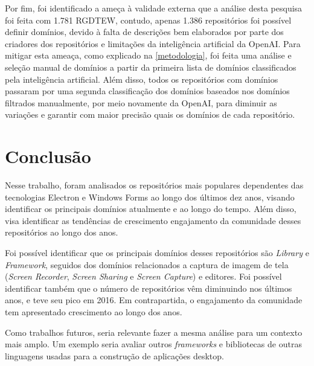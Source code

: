 \documentclass[12pt]{article}
\begin{document}
Por fim, foi identificado a ameça à validade externa que a análise desta pesquisa foi feita com 1.781 RGDTEW, contudo, apenas 1.386 repositórios foi possível definir domínios, devido à falta de descrições bem elaborados por parte dos criadores dos repositórios e limitações da inteligência artificial da OpenAI. Para mitigar esta ameaça, como explicado na \ref{metodologia}, foi feita uma análise e seleção manual de domínios a partir da primeira lista de domínios classificados pela inteligência artificial. Além disso, todos os repositórios com domínios passaram por uma segunda classificação dos domínios baseados nos domínios filtrados manualmente, por meio novamente da OpenAI, para diminuir as variações e garantir com maior precisão quais os domínios de cada repositório.

\section{Conclusão} \label{conclusao}

Nesse trabalho, foram analisados os repositórios mais populares dependentes das tecnologias Electron e Windows Forms ao longo dos últimos dez anos, visando identificar os principais domínios atualmente e ao longo do tempo. Além disso, visa identificar as tendências de crescimento engajamento da comunidade desses repositórios ao longo dos anos. 

Foi possível identificar que os principais domínios desses repositórios são  \textit{Library} e \textit{Framework}, seguidos dos domínios relacionados a captura de imagem de tela (\textit{Screen Recorder}, \textit{Screen Sharing} e \textit{Screen Capture}) e editores. Foi possível identificar também que o número de repositórios vêm diminuindo nos últimos anos, e teve seu pico em 2016. Em contrapartida, o engajamento da comunidade tem apresentado crescimento ao longo dos anos.

Como trabalhos futuros, seria relevante fazer a mesma análise para um contexto mais amplo. Um exemplo seria avaliar outros \textit{frameworks} e bibliotecas de outras linguagens usadas para a construção de aplicações desktop.



\end{document}
